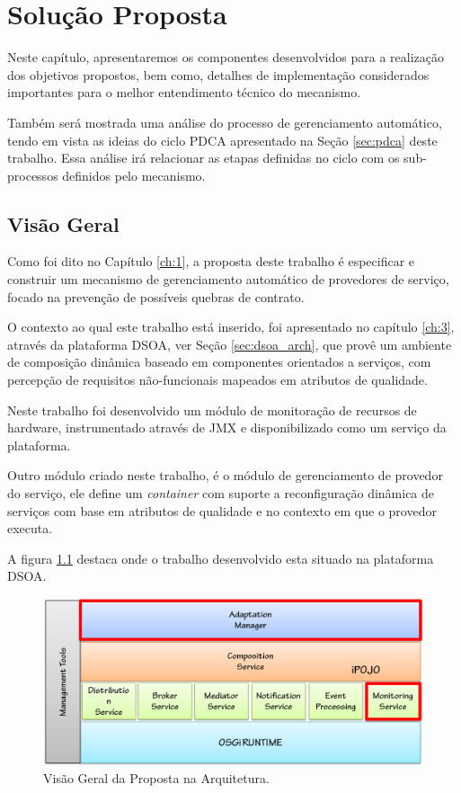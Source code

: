 \chapter{Solução Proposta}
\label{ch:4}

Neste capítulo, apresentaremos os componentes desenvolvidos para a realização dos objetivos propostos, bem como, detalhes de implementação considerados importantes para o melhor entendimento técnico do mecanismo. 

Também será mostrada uma análise do processo de gerenciamento automático, tendo em vista as ideias do ciclo PDCA apresentado na Seção \ref{sec:pdca} deste trabalho. Essa análise irá relacionar as etapas definidas no ciclo com os sub-processos definidos pelo mecanismo.

\section{Visão Geral}
Como foi dito no Capítulo \ref{ch:1}, a proposta deste trabalho é especificar e construir um mecanismo de gerenciamento automático de provedores de serviço, focado na prevenção de possíveis quebras de contrato.

O contexto ao qual este trabalho está inserido, foi apresentado no capítulo \ref{ch:3}, através da plataforma DSOA, ver Seção \ref{sec:dsoa_arch}, que provê um ambiente de composição dinâmica baseado em componentes orientados a serviços, com percepção de requisitos não-funcionais mapeados em atributos de qualidade.

Neste trabalho foi desenvolvido um módulo de monitoração de recursos de hardware, instrumentado através de JMX e disponibilizado como um serviço da plataforma. 

Outro módulo criado neste trabalho, é o módulo de gerenciamento de provedor do serviço, ele define um \textit{container} com suporte a reconfiguração dinâmica de serviços com base em atributos de qualidade e no contexto em que o provedor executa.

A figura \ref{fig:proposal} destaca onde o trabalho desenvolvido esta situado na plataforma DSOA.

\begin{figure}[htp]
\centering
\includegraphics[width=12cm]{chapters/chapter4/dsoa-provider-manager.png}
\caption[Visão Geral da Proposta na Arquitetura]{Visão Geral da Proposta na Arquitetura.}
\label{fig:proposal}
\end{figure}

